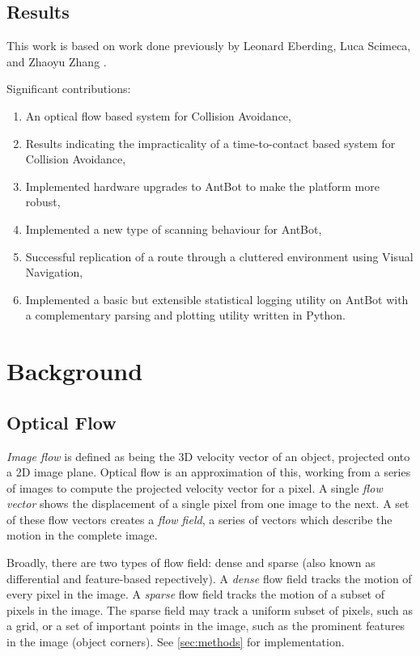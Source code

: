 \documentclass[a4paper,12pt]{article}
\begin{document}
\subsection { Results }
This work is based on work done previously by Leonard Eberding, Luca Scimeca, and Zhaoyu Zhang
\cite{Eberding2016, Scimeca2017, Zhang2017}.
\newline

Significant contributions:
\begin{enumerate}
  \item{An optical flow based system for Collision Avoidance,}
  \item{Results indicating the impracticality of a time-to-contact based system for Collision Avoidance,}
  \item{Implemented hardware upgrades to AntBot to make the platform more robust,}
  \item{Implemented a new type of scanning behaviour for AntBot,}
  \item{Successful replication of a route through a cluttered environment using Visual Navigation,}
  \item{Implemented a basic but extensible statistical logging utility on AntBot with a complementary parsing and plotting utility written in Python.} %
\end{enumerate}
\newpage

\section{ Background}
\subsection{ Optical Flow }
\textit{Image flow} is defined as being the 3D velocity vector of an object, projected onto a
2D image plane\cite{ODonovan2005}. Optical flow is an approximation of this, working from a series
of images to compute the projected velocity vector for a pixel. A single \textit{flow vector}
shows the displacement of a single pixel from one image to the next. A set of these flow vectors
creates a \textit{flow field}, a series of vectors which describe the motion in the complete image.
\newline

Broadly, there are two types of flow field: dense and sparse (also known as differential and
feature-based repectively\cite{Low2005}). A \textit{dense} flow field tracks
the motion of every pixel in the image. A \textit{sparse} flow field tracks the motion of a subset
of pixels in the image. The sparse field may track a uniform subset of pixels, such as a grid, or a
set of important points in the image, such as the prominent features in the image (object corners).
See \ref{sec:methods} for implementation.
\end{document}
